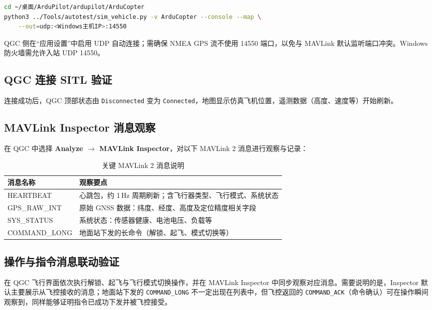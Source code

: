 \documentclass[12pt,a4paper]{article}
\begin{document}
\begin{lstlisting}[language=bash]
cd ~/桌面/ArduPilot/ardupilot/ArduCopter
python3 ../Tools/autotest/sim_vehicle.py -v ArduCopter --console --map \
    --out=udp:<Windows主机IP>:14550
\end{lstlisting}

QGC 侧在“应用设置”中启用 UDP 自动连接；需确保 NMEA GPS 流不使用 14550 端口，以免与 MAVLink 默认监听端口冲突。Windows 防火墙需允许入站 UDP 14550。

\subsection{QGC 连接 SITL 验证}

连接成功后，QGC 顶部状态由 \texttt{Disconnected} 变为 \texttt{Connected}，地图显示仿真飞机位置，遥测数据（高度、速度等）开始刷新。

\subsection{MAVLink Inspector 消息观察}

在 QGC 中选择 \textbf{Analyze $\rightarrow$ MAVLink Inspector}，对以下 MAVLink 2 消息进行观察与记录：

\begin{table}[htbp]
\centering
\caption{关键 MAVLink 2 消息说明}
\begin{tabular}{p{3.2cm}p{9.8cm}}
\toprule
\textbf{消息名称} & \textbf{观察要点} \\
\midrule
HEARTBEAT & 心跳包，约 1\,Hz 周期刷新；含飞行器类型、飞行模式、系统状态 \\
GPS\_RAW\_INT & 原始 GNSS 数据：纬度、经度、高度及定位精度相关字段 \\
SYS\_STATUS & 系统状态：传感器健康、电池电压、负载等 \\
COMMAND\_LONG & 地面站下发的长命令（解锁、起飞、模式切换等） \\
\bottomrule
\end{tabular}
\end{table}

\subsection{操作与指令消息联动验证}

在 QGC 飞行界面依次执行解锁、起飞与飞行模式切换操作，并在 MAVLink Inspector 中同步观察对应消息。需要说明的是，Inspector 默认主要展示从飞控接收的消息；地面站下发的 \texttt{COMMAND\_LONG} 不一定出现在列表中，但飞控返回的 \texttt{COMMAND\_ACK}（命令确认）可在操作瞬间观察到，同样能够证明指令已成功下发并被飞控接受。
\end{document}
